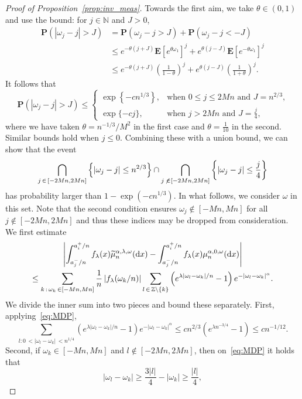 \documentclass[10pt]{amsart}
\theoremstyle{definition}\newtheorem{defi}[theo]{Definition}\newtheorem{rema}[theo]{Remark}\newtheorem{exam}[theo]{Example}\newtheorem{exem}[theo]{Example}\newtheorem{nota}[theo]{Notation}
\newcommand{\N}{\mathbb N}
\newcommand{\Z}{\mathbb Z}
\newcommand{\bfP}{\mathbf{P}}
\newcommand{\bfE}{\mathbf{E}}
\newcommand{\dd}{\text{\upshape{d}}}
\let\oldtilde\tilde
\renewcommand*{\tilde}[1]{\mathchoice{\widetilde{#1}}{\widetilde{#1}}{\oldtilde{#1}}{\oldtilde{#1}}}
\begin{document}
\begin{proof}[Proof of Proposition~\ref{prop:inv_meas}]
Towards the first aim, we take $\theta\in (0,1)$ and use the bound: for $j\in\N$ and $J>0$,
\begin{align*}
\bfP(|\omega_j-j|>J) &= \bfP(\omega_j-j>J)+\bfP(\omega_j-j<-J)\\
&\le e^{-\theta(j+J)}\bfE\left[e^{\theta\omega_1}\right]^j+e^{\theta(j-J)}\bfE\left[e^{-\theta\omega_1}\right]^j\\
&\le e^{-\theta(j+J)}\left(\frac{1}{1-\theta}\right)^j+e^{\theta(j-J)}\left(\frac{1}{1+\theta}\right)^j.
\end{align*}
It follows that
\[
\bfP(|\omega_j-j|>J) \le
\begin{cases}
\exp\left\{-cn^{1/3}\right\}, & \text{when $0\leq j \le 2Mn$ and $J=n^{2/3}$,} \\
\exp\{-cj\}, & \text{when $j > 2Mn$ and $J=\frac{j}{4}$,}
\end{cases}
\]
where we have taken $\theta=n^{-1/3}/M^2$ in the first case and $\theta=\frac{1}{10}$ in the second. Similar bounds hold when $j\leq 0$. Combining these with a union bound, we can show that the event
\begin{align}\label{eq:MDP}
\bigcap_{j\,\in\,[-2Mn, 2Mn]}\left\{|\omega_j-j| \le n^{2/3}\right\}\cap \bigcap_{j\,\not\,\in[-2Mn, 2Mn]}\left\{|\omega_j-j| \le \frac{j}{4}\right\}
\end{align}
has probability larger than $1-\exp(-cn^{1/3})$. In what follows, we consider $\omega$ in this set. Note that the second condition ensures $\omega_j \not\in [-Mn,Mn]$ for all $j\not\in[-2Mn, 2Mn]$ and thus these indices may be dropped from consideration. We first estimate
\begin{multline}\label{eq:mu(f)}
\left|\int_{a_j^-/n}^{a_i^+/n} f_\lambda(x)\tilde{\mu}_n^{\alpha,\lambda,\omega}(\dd x) -\int_{a_j^-/n}^{a_i^+/n} f_\lambda(x)\mu_n^{\alpha,0,\omega}(\dd x)\right|\\
\le \sum_{k\,:\,\omega_k\,\in[-Mn,Mn]}\frac{1}{n}\left|f_\lambda(\omega_k/n)\right|\sum_{l\,\in\,\Z\setminus\{k\}}\left(e^{\lambda|\omega_l-\omega_k|/n}-1\right)e^{-\left|\omega_l-\omega_k\right|^\alpha}.
\end{multline}
We divide the inner sum into two pieces and bound these separately. First, applying~\eqref{eq:MDP},
\[
\sum_{l\colon 0\,<|\omega_l-\omega_k|\,<n^{1/4}}\left(e^{\lambda|\omega_l-\omega_k|/n}-1\right)e^{-|\omega_l-\omega_k|^\alpha}\le c n^{2/3} \left(e^{\lambda n^{-3/4}}-1\right) \le c n^{-1/12}.
\]
Second, if $\omega_k\in[-Mn,Mn]$ and $l\not\in[-2Mn, 2Mn]$, then on~\eqref{eq:MDP} it holds that
\[
\left|\omega_l-\omega_k\right|\geq \frac{3|l|}{4}-|\omega_k|\geq \frac{|l|}{4},
\]
\end{proof}
\end{document}
